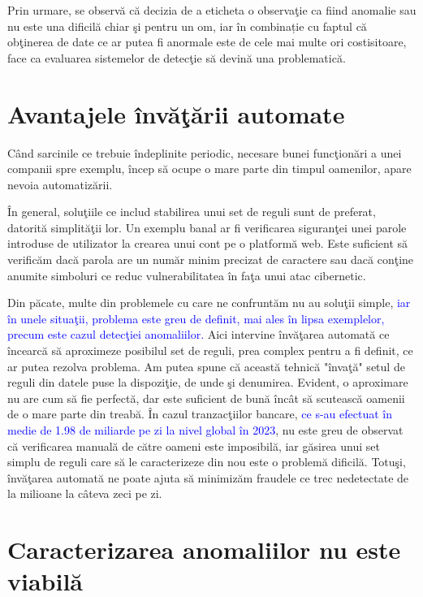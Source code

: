 Prin urmare, se observă că decizia de a eticheta o observaţie ca fiind anomalie 
sau nu este una dificilă chiar şi pentru un om, iar în combinație cu faptul 
că obţinerea de date ce ar putea fi anormale este de cele mai multe ori costisitoare,
face ca evaluarea sistemelor de detecţie să devină una problematică.


\section{Avantajele învăţării automate}

Când sarcinile ce trebuie îndeplinite periodic, necesare bunei funcţionări a unei 
companii spre exemplu, încep să ocupe o mare parte din timpul oamenilor, apare 
nevoia automatizării. 

În general, soluţiile ce includ stabilirea unui set de reguli
sunt de preferat, datorită simplităţii lor. Un exemplu banal ar fi verificarea 
siguranţei unei parole introduse de utilizator la crearea unui cont pe o platformă
web. Este suficient să verificăm dacă parola are un număr minim precizat de caractere 
sau dacă conţine anumite simboluri ce reduc vulnerabilitatea în faţa unui atac cibernetic.

Din păcate, multe din problemele cu care ne confruntăm nu au soluţii simple, 
\textcolor{blue}{iar 
în unele situaţii, problema este greu de definit, mai ales în lipsa exemplelor, precum 
este cazul detecţiei anomaliilor.}
Aici intervine învăţarea automată ce încearcă să aproximeze posibilul set de reguli, 
prea complex pentru a fi definit, ce ar putea rezolva problema. Am putea spune că 
această tehnică "învaţă" setul de reguli 
din datele puse la dispoziţie, de unde şi denumirea. Evident, o aproximare 
nu are cum să fie perfectă, dar este suficient de bună încât să scutească oamenii de 
o mare parte din treabă. În cazul tranzacţiilor bancare, \textcolor{blue}
{ce s-au efectuat în medie 
de 1.98 de miliarde pe zi la nivel global în 2023}\cite{transactions-per-day}, 
nu este greu de observat că verificarea manuală
de către oameni este imposibilă, iar găsirea unui set simplu de reguli care să 
le caracterizeze din nou este o problemă dificilă. Totuşi, învăţarea automată 
ne poate ajuta să minimizăm fraudele ce trec nedetectate de la milioane la câteva zeci
pe zi.

\section{Caracterizarea anomaliilor nu este viabilă}

